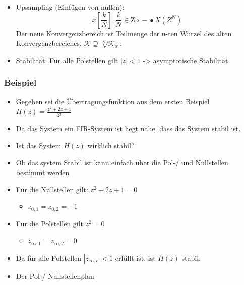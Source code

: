 \documentclass[11pt]{article}
\providecommand{\tightlist}{%
      \setlength{\itemsep}{0pt}\setlength{\parskip}{0pt}}
\begin{document}
    \begin{itemize}
\tightlist
\item
  Upsampling (Einfügen von nullen):
  \[x[\frac{k}{N}], \frac{k}{N} \in\mathrm{Z} \circ \!\!-\!\!\bullet X(Z^N)\]
  Der neue Konvergenzbereich ist Teilmenge der n-ten Wurzel des alten
  Konvergenzbereiches,
  \(\mathcal{K} \supseteq \sqrt[N]{\mathcal{K}_x}\).
\end{itemize}

    \begin{itemize}
\tightlist
\item
  Stabilität: Für alle Polstellen gilt \(|z| < 1\) -\textgreater{}
  asymptotische Stabilität
\end{itemize}

    \subsubsection{Beispiel}\label{beispiel}

\begin{itemize}
\item
  Gegeben sei die Übertragungsfunktion aus dem ersten Beispiel
  \(H(z) = \frac{z^2 + 2z + 1}{z^2}\)
\item
  Da das System ein FIR-System ist liegt nahe, dass das System stabil
  ist.
\item
  Ist das System \(H(z)\) wirklich stabil?
\item
  Ob das system Stabil ist kann einfach über die Pol-/ und Nullstellen
  bestimmt werden
\item
  Für die Nullstellen gilt: \(z^2 + 2z + 1 = 0\)

  \begin{itemize}
  \tightlist
  \item
    \(z_{0,1} = z_{0,2} = -1\)
  \end{itemize}
\item
  Für die Polstellen gilt \(z^2 = 0\)

  \begin{itemize}
  \tightlist
  \item
    \(z_{\infty,1} = z_{\infty,2} = 0\)
  \end{itemize}
\item
  Da für alle Polstellen \(|z_{\infty,i}| < 1\) erfüllt ist, ist
  \(H(z)\) stabil.
\item
  Der Pol-/ Nullstellenplan
\end{itemize}
\end{document}
